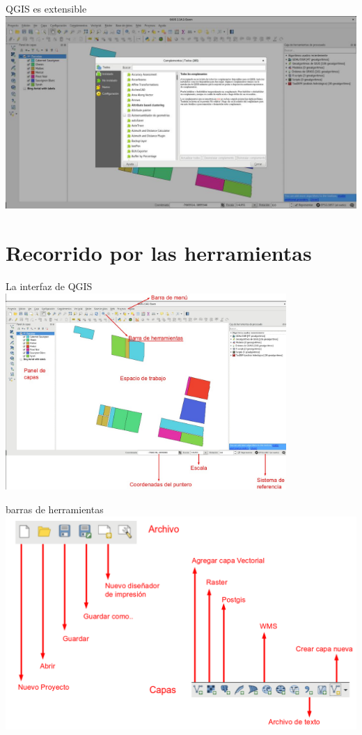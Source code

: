 \documentclass{beamer}
\begin{document}
\begin{frame}{QGIS es extensible}
	\centering
	\includegraphics[width=1\textwidth]{IMGs/QGIS-plugins}
\end{frame}



\section{Recorrido por las herramientas}

\begin{frame}{La interfaz de QGIS}
	\centering
	\includegraphics[width=0.8\textwidth]{IMGs/interfaz}
\end{frame}

\begin{frame}{barras de herramientas}
	\centering
	\includegraphics[width=1\textwidth]{IMGs/tb1}
\end{frame}
\end{document}
